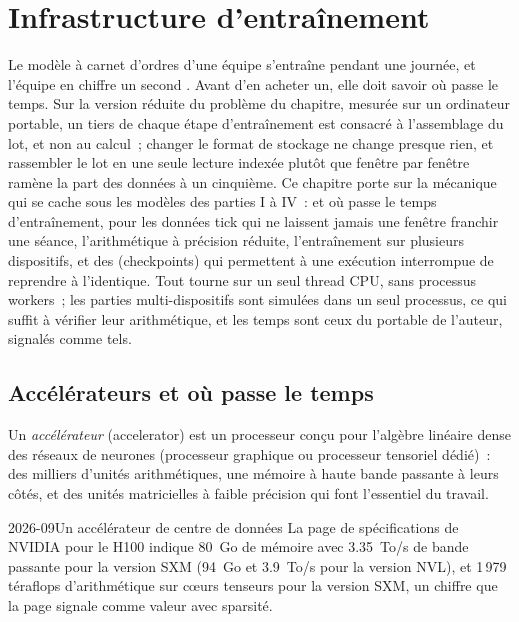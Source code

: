 \chapter{Infrastructure d'entraînement}\label{ch:ml:training-infrastructure}

Le modèle à carnet d'ordres d'une équipe s'entraîne pendant une journée, et l'équipe en chiffre un second . Avant d'en acheter un, elle doit savoir
où passe le temps. Sur la version réduite du problème du chapitre, mesurée sur un ordinateur portable, un tiers de chaque étape d'entraînement est
consacré à l'assemblage du lot, et non au calcul~; changer le format de stockage ne change presque rien, et rassembler le lot en une seule
lecture indexée plutôt que fenêtre par fenêtre ramène la part des données à un cinquième. Ce chapitre porte sur la mécanique qui se cache sous les
modèles des parties I à IV~:  et où passe le temps d'entraînement,  pour les données tick qui ne laissent jamais une fenêtre franchir
une séance, l'arithmétique à précision réduite, l'entraînement sur plusieurs dispositifs, et des  (checkpoints) qui permettent à une exécution interrompue de reprendre à l'identique.
Tout tourne sur un seul thread CPU, sans processus workers~; les parties multi-dispositifs sont simulées dans un seul processus, ce qui
suffit à vérifier leur arithmétique, et les temps sont ceux du portable de l'auteur, signalés comme tels.

\section{Accélérateurs et où passe le temps}

\begin{definition}[Accélérateur]\label{def:ml:training-infrastructure:accelerator}
Un \emph{accélérateur} (accelerator) est un processeur conçu pour l'algèbre linéaire dense des réseaux de neurones (processeur graphique
ou processeur tensoriel dédié)~: des milliers d'unités arithmétiques, une mémoire à haute bande passante à leurs côtés, et
des unités matricielles à faible précision qui font l'essentiel du travail.
\end{definition}

\begin{dated}{2026-09}{Un accélérateur de centre de données}\label{dat:ml:training-infrastructure:h100}
La page de spécifications de NVIDIA pour le H100 indique 80~Go de mémoire avec 3.35~To/s de bande passante pour la version SXM (94~Go et
3.9~To/s pour la version NVL), et 1\,979 téraflops d'arithmétique  sur cœurs tenseurs pour la version SXM, un chiffre que la page
signale comme valeur avec sparsité.
\end{dated}

